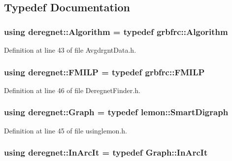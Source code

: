 \subsection{Typedef Documentation}
\subsubsection[{\texorpdfstring{Algorithm}{Algorithm}}]{\setlength{\rightskip}{0pt plus 5cm}using {\bf deregnet\+::\+Algorithm} = typedef grbfrc\+::\+Algorithm}\hypertarget{namespacederegnet_ad59156f873b7ab02d384164b900cd874}{}\label{namespacederegnet_ad59156f873b7ab02d384164b900cd874}


Definition at line 43 of file Avgdrgnt\+Data.\+h.

\subsubsection[{\texorpdfstring{F\+M\+I\+LP}{FMILP}}]{\setlength{\rightskip}{0pt plus 5cm}using {\bf deregnet\+::\+F\+M\+I\+LP} = typedef grbfrc\+::\+F\+M\+I\+LP}\hypertarget{namespacederegnet_a31759ad43b8b9641205bcf69b09f10c5}{}\label{namespacederegnet_a31759ad43b8b9641205bcf69b09f10c5}


Definition at line 46 of file Deregnet\+Finder.\+h.

\subsubsection[{\texorpdfstring{Graph}{Graph}}]{\setlength{\rightskip}{0pt plus 5cm}using {\bf deregnet\+::\+Graph} = typedef lemon\+::\+Smart\+Digraph}\hypertarget{namespacederegnet_a55b76c55bbabc682cbc61f8b9948799e}{}\label{namespacederegnet_a55b76c55bbabc682cbc61f8b9948799e}


Definition at line 45 of file usinglemon.\+h.

\subsubsection[{\texorpdfstring{In\+Arc\+It}{InArcIt}}]{\setlength{\rightskip}{0pt plus 5cm}using {\bf deregnet\+::\+In\+Arc\+It} = typedef Graph\+::\+In\+Arc\+It}\hypertarget{namespacederegnet_aed58be361aeda4ef7a9eaca2731ba830}{}\label{namespacederegnet_aed58be361aeda4ef7a9eaca2731ba830}


